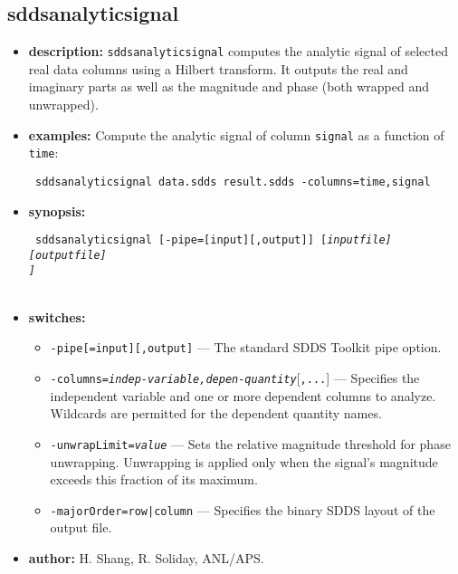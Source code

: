 \newpage
\subsection{sddsanalyticsignal}
\label{sddsanalyticsignal}

\begin{itemize}
\item {\bf description:}
{\tt sddsanalyticsignal} computes the analytic signal of selected real data columns
using a Hilbert transform.  It outputs the real and imaginary parts as well as
the magnitude and phase (both wrapped and unwrapped).
\item {\bf examples:}
Compute the analytic signal of column {\tt signal} as a function of {\tt time}:
\begin{flushleft}{\tt
sddsanalyticsignal data.sdds result.sdds -columns=time,signal
}\end{flushleft}
\item {\bf synopsis:}
\begin{flushleft}{\tt
sddsanalyticsignal [-pipe=[input][,output]] [\em inputfile] [\em outputfile] \\
  [-columns=\em indep-variable,\em depen-quantity[,...]] \\
  [-unwrapLimit=\em value] \\
  [-majorOrder=row|column]
}\end{flushleft}
\item {\bf switches:}
    \begin{itemize}
    \item \verb|-pipe[=input][,output]| --- The standard SDDS Toolkit pipe option.
    \item {\tt -columns=\em indep-variable,\em depen-quantity}[{\tt ,...}] ---
    Specifies the independent variable and one or more dependent columns to
    analyze.  Wildcards are permitted for the dependent quantity names.
    \item {\tt -unwrapLimit=\em value} --- Sets the relative magnitude threshold
    for phase unwrapping.  Unwrapping is applied only when the signal's
    magnitude exceeds this fraction of its maximum.
    \item {\tt -majorOrder=row|column} --- Specifies the binary SDDS layout of
    the output file.
    \end{itemize}
\item {\bf author:} H. Shang, R. Soliday, ANL/APS.
\end{itemize}
